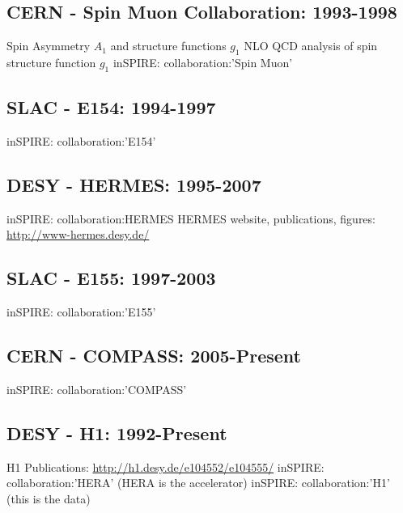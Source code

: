 \subsection{CERN - Spin Muon Collaboration: 1993-1998}
Spin Asymmetry $A_1$ and structure functions $g_1$ \cite{Adeva1998}
NLO QCD analysis of spin structure function $g_1$ \cite{Adeva1998a}
inSPIRE: collaboration:'Spin Muon'

\subsection{SLAC - E154: 1994-1997} 
inSPIRE: collaboration:'E154'

\subsection{DESY - HERMES: 1995-2007}
inSPIRE: collaboration:HERMES
HERMES website, publications, figures: \url{http://www-hermes.desy.de/}

\subsection{SLAC - E155: 1997-2003}
inSPIRE: collaboration:'E155'

\subsection{CERN - COMPASS: 2005-Present}
inSPIRE: collaboration:'COMPASS'

\subsection{DESY - H1: 1992-Present}
H1 Publications: \url{http://h1.desy.de/e104552/e104555/}
inSPIRE: collaboration:'HERA' (HERA is the accelerator)
inSPIRE: collaboration:'H1' (this is the data)


